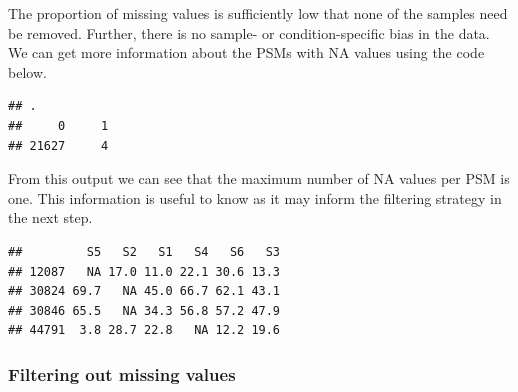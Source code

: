 \documentclass[9pt,a4paper,]{extarticle}
\newenvironment{Shaded}{\begin{snugshade}}{\end{snugshade}}
\newcommand{\DecValTok}[1]{\textcolor[rgb]{0.00,0.00,0.81}{#1}}
\newcommand{\DocumentationTok}[1]{\textcolor[rgb]{0.56,0.35,0.01}{\textbf{\textit{#1}}}}
\newcommand{\FunctionTok}[1]{\textcolor[rgb]{0.13,0.29,0.53}{\textbf{#1}}}
\newcommand{\NormalTok}[1]{#1}
\newcommand{\OtherTok}[1]{\textcolor[rgb]{0.56,0.35,0.01}{#1}}
\newcommand{\SpecialCharTok}[1]{\textcolor[rgb]{0.81,0.36,0.00}{\textbf{#1}}}
\newcommand{\StringTok}[1]{\textcolor[rgb]{0.31,0.60,0.02}{#1}}
\begin{document}
The proportion of missing values is sufficiently low that none of the samples
need be removed. Further, there is no sample- or condition-specific bias in the
data. We can get more information about the PSMs with NA values using the code
below.

\begin{Shaded}
\end{Shaded}

\begin{verbatim}
## .
##     0     1 
## 21627     4
\end{verbatim}

From this output we can see that the maximum number of NA values per PSM is one.
This information is useful to know as it may inform the filtering strategy in the
next step.

\begin{Shaded}
\end{Shaded}

\begin{verbatim}
##         S5   S2   S1   S4   S6   S3
## 12087   NA 17.0 11.0 22.1 30.6 13.3
## 30824 69.7   NA 45.0 66.7 62.1 43.1
## 30846 65.5   NA 34.3 56.8 57.2 47.9
## 44791  3.8 28.7 22.8   NA 12.2 19.6
\end{verbatim}

\subsubsection{Filtering out missing values}\label{filtering-out-missing-values}
\end{document}
